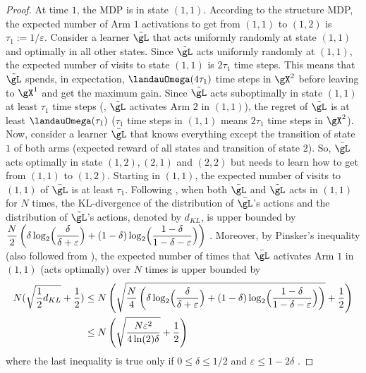 \begin{proof}
    At time $1$, the MDP is in state $(1,1)$.
    According to the structure MDP, the expected number of Arm $1$ activations to get from $(1,1)$ to $(1,2)$ is $\tau_1:=1/\varepsilon$.
    Consider a learner $\tilde{\gL}$ that acts uniformly randomly at state $(1,1)$ and optimally in all other states. 
    Since $\tilde{\gL}$ acts uniformly randomly at $(1,1)$, the expected number of visits to state $(1,1)$ is $2\tau_1$ time steps.
    This means that $\tilde{\gL}$ spends, in expectation, $\landauOmega(4\tau_1)$ time steps in $\gX^2$ before leaving to $\gX^1$ and get the maximum gain.
    Since $\tilde{\gL}$ acts suboptimally in state $(1,1)$ at least $\tau_1$ time steps (\ie, $\tilde{\gL}$ activates Arm $2$ in $(1,1)$), the regret of $\tilde{\gL}$ is at least $\landauOmega(\tau_1)$ ($\tau_1$ time steps in $(1,1)$ means $2\tau_1$ time steps in $\gX^2$).
    Now, consider a learner $\bar{\gL}$ that knows everything except the transition of state $1$ of both arms (expected reward of all states and transition of state $2$).
    So, $\bar{\gL}$ acts optimally in state $(1,2), (2,1)$ and $(2,2)$ but needs to learn how to get from $(1,1)$ to $(1,2)$.
    Starting in $(1,1)$, the expected number of visits to $(1,1)$ of $\bar{\gL}$ is at least $\tau_1$.
    Following \cite{osband2016lower}, when both $\bar{\gL}$ and $\tilde{\gL}$ acts in $(1,1)$ for $N$ times, the KL-divergence of the distribution of $\bar{\gL}$'s actions and the distribution of $\tilde{\gL}$'s actions, denoted by $d_{KL}$, is upper bounded by $\displaystyle\frac{N}{2}\left(\delta\log_2\Bigl(\frac{\delta}{\delta+\varepsilon}\Bigr)+(1-\delta)\log_2\Bigl(\frac{1-\delta}{1-\delta-\varepsilon}\Bigr)\right)$ \cite[Lemma~2]{osband2016lower}.
    Moreover, by Pinsker's inequality (also followed from \cite{osband2016lower}), the expected number of times that $\bar{\gL}$ activates Arm $1$ in $(1,1)$ (\ie acts optimally) over $N$ times is upper bounded by
    \begin{align*}
        N(\sqrt{\frac12d_{KL}}+\frac12)
        &\le N\left(\sqrt{\frac{N}{4}\left(\delta\log_2\Bigl(\frac{\delta}{\delta+\varepsilon}\Bigr)+(1-\delta)\log_2\Bigl(\frac{1-\delta}{1-\delta-\varepsilon}\Bigr)\right)}+\frac12\right) \\
        &\le N\left(\sqrt{\frac{N\varepsilon^2}{4\ln(2)\delta}}+\frac12\right)
    \end{align*}
    where the last inequality is true only if $0\le\delta\le1/2$ and $\varepsilon\le1-2\delta$ \cite[Proposition~1]{osband2016lower}.

\end{proof}
